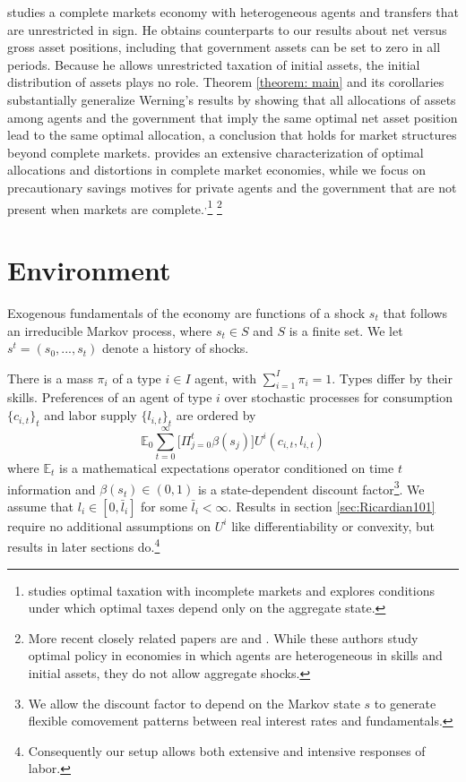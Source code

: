 \documentclass[thmsb,11pt]{article}
\begin{document}
\citet{Wer07a} studies a complete markets economy with heterogeneous agents
and transfers that are unrestricted in sign. He obtains counterparts to our
results about net versus gross asset positions, including that government
assets can be set to zero in all periods. Because he allows unrestricted
taxation of initial assets, the initial distribution of assets plays no
role. Theorem \ref{theorem: main} and its corollaries substantially
generalize Werning's results by showing that all allocations of assets among
agents and the government that imply the same optimal net asset position
lead to the same optimal allocation, a conclusion that holds for market
structures beyond complete markets. \citet{Wer07a} provides an extensive
characterization of optimal allocations and distortions in complete market
economies, while we focus on precautionary savings motives for private
agents and the government that are not present when markets are complete.$%
^{,}$\footnote{%
\cite{Werning2012} studies optimal taxation with incomplete markets and explores
conditions under which optimal taxes depend only on the aggregate state.}
\footnote{%
More recent closely related papers are \citet{Azzimonti2008,Azzimonti2008a} and \citet{Correia2010}. While these authors study optimal policy in
 economies in which agents are heterogeneous in skills and initial assets, they
  do not allow aggregate shocks.}


\section{Environment\label{Sec: environment}}

\smallskip  %
Exogenous fundamentals
of the
economy are  functions of a shock  $s_{t}$  that follows an irreducible Markov process, where $s_{t}\in S$ and $S$ is a finite set. We let $s^{t}=\left(
s_{0},...,s_{t}\right) $ denote a history of shocks.

There is a mass $\pi _{i}$
of a type $i\in I$ agent, with $\sum_{i=1}^{I}\pi _{i}=1.$ Types differ by their skills.
Preferences of an
agent of type $i$ over stochastic processes for consumption $\{c_{i,t}\}_t$
and labor supply $\{l_{i,t}\}_t$ are ordered by
\begin{equation}
\mathbb{E}_{0}\sum_{t=0}^{\infty } \bigl[\Pi_{j=0}^t \beta(s_j)\bigr] U^{i}\left(
c_{i,t},l_{i,t}\right)  \label{utility lifetime}
\end{equation}%
where $\mathbb{E}_{t}$ is a mathematical expectations operator conditioned
on time $t$ information and $\beta(s_t) \in \left( 0,1\right) $ is a state-dependent discount
factor\footnote{We allow the discount factor to depend on the Markov state $s$ to generate flexible  comovement patterns between real interest rates and fundamentals. }. We assume that $l_{i}\in \left[ 0,\bar{l}_{i}\right] $ for some $%
\bar{l}_{i}<\infty .$ Results in section  \ref{sec:Ricardian101} require no
additional assumptions on $U^{i}$ like  differentiability or convexity, but results in later sections do.\footnote{Consequently  our setup allows both extensive and intensive responses of labor.}
\end{document}
